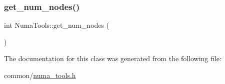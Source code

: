 \subsubsection{\texorpdfstring{get\+\_\+num\+\_\+nodes()}{get\_num\_nodes()}}
{\footnotesize\ttfamily int Numa\+Tools\+::get\+\_\+num\+\_\+nodes (\begin{DoxyParamCaption}{ }\end{DoxyParamCaption})\hspace{0.3cm}{\ttfamily [inline]}}



The documentation for this class was generated from the following file\+:\begin{DoxyCompactItemize}
\item 
common/\hyperlink{numa__tools_8h}{numa\+\_\+tools.\+h}\end{DoxyCompactItemize}

